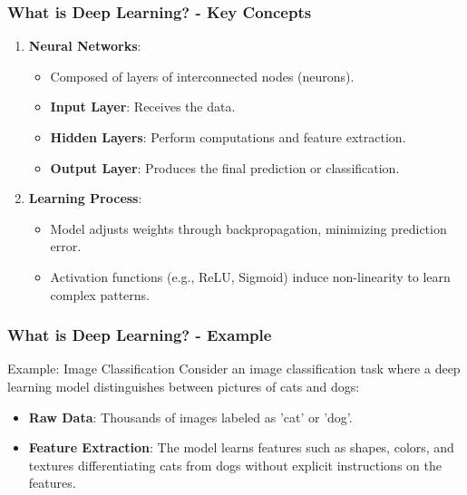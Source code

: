 \documentclass[aspectratio=169]{beamer}
\begin{document}
\begin{frame}[fragile]
    \frametitle{What is Deep Learning? - Key Concepts}
    \begin{enumerate}
        \item \textbf{Neural Networks}:
            \begin{itemize}
                \item Composed of layers of interconnected nodes (neurons).
                \item \textbf{Input Layer}: Receives the data.
                \item \textbf{Hidden Layers}: Perform computations and feature extraction.
                \item \textbf{Output Layer}: Produces the final prediction or classification.
            \end{itemize}
        \item \textbf{Learning Process}:
            \begin{itemize}
                \item Model adjusts weights through backpropagation, minimizing prediction error.
                \item Activation functions (e.g., ReLU, Sigmoid) induce non-linearity to learn complex patterns.
            \end{itemize}
    \end{enumerate}
\end{frame}

\begin{frame}[fragile]
    \frametitle{What is Deep Learning? - Example}
    \begin{block}{Example: Image Classification}
        Consider an image classification task where a deep learning model distinguishes between pictures of cats and dogs:
        \begin{itemize}
            \item \textbf{Raw Data}: Thousands of images labeled as 'cat' or 'dog'.
            \item \textbf{Feature Extraction}: The model learns features such as shapes, colors, and textures differentiating cats from dogs without explicit instructions on the features.
        \end{itemize}
    \end{block}
\end{frame}
\end{document}
